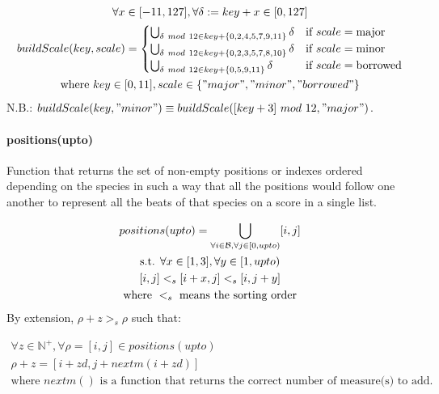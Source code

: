 \begin{equation}
    \begin{gathered}
        \forall x \in [-11, 127], \forall \delta := key+x \in [0, 127]\\
        buildScale(key, scale) = \begin{cases}
            \bigcup _{\delta\ mod\ 12 \in key + \{0, 2, 4, 5, 7, 9, 11\}} \delta & \text{if } scale = \text{major}\\
            \bigcup _{\delta\ mod\ 12 \in key + \{0, 2, 3, 5, 7, 8, 10\}} \delta & \text{if } scale = \text{minor}\\
            \bigcup _{\delta\ mod\ 12 \in key + \{0, 5, 9, 11\}} \delta & \text{if } scale = \text{borrowed}
        \end{cases}\\
        \text{where } key \in [0, 11], scale \in \{"major", "minor", "borrowed"\}
    \end{gathered}
    \label{eq:buildScale}
\end{equation}
N.B.: $buildScale(key, "minor") \equiv buildScale([key+3]\ mod\ 12, "major")$.

\paragraph{positions(upto)} Function that returns the set of non-empty positions or indexes ordered depending on the species in such a way that all the positions would follow one another to represent all the beats of that species on a score in a single list.

\begin{equation}
    \begin{gathered}
        positions(upto) = \bigcup _{\forall i \in \mathcal{B}, \forall j \in [0, upto)} [i, j]\\
        \text{s.t. } \forall x \in [1, 3], \forall y \in [1, upto)\\
        [i, j] <_{s} [i + x, j] <_{s} [i, j + y]\\
        \text{where } <_{s} \text{ means the sorting order}\\
    \end{gathered}
\end{equation}
By extension, $\rho + z >_{s} \rho$ such that:

\begin{equation}
    \begin{gathered}
        \forall z \in \mathbb{N}^+, \forall \rho = [i, j] \in positions(upto)\\
        \rho + z = [i + zd, j + nextm(i+zd)]\\
        \text{where } nextm() \text{ is a function that returns the correct number of measure(s) to add.}
    \end{gathered}
\end{equation}

